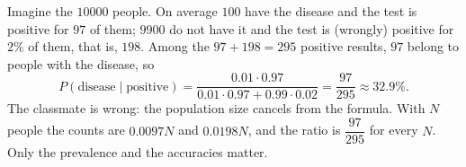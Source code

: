 Imagine the $10000$ people. On average $100$ have the disease and the test is positive for $97$ of them; $9900$ do not have it and the test is (wrongly) positive for $2\%$ of them, that is, $198$. Among the $97+198=295$ positive results, $97$ belong to people with the disease, so
\[
P(\text{disease}\mid\text{positive})=\dfrac{0.01\cdot0.97}{0.01\cdot0.97+0.99\cdot0.02}=\boxed{\dfrac{97}{295}}\approx32.9\%.
\]
The classmate is wrong: the population size cancels from the formula. With $N$ people the counts are $0.0097N$ and $0.0198N$, and the ratio is $\dfrac{97}{295}$ for every $N$. Only the prevalence and the accuracies matter.
